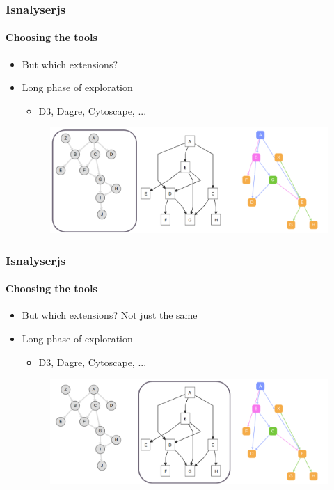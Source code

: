 \documentclass[9pt]{beamer}
\begin{document}
\begin{frame}
\frametitle{Isnalyserjs}
\framesubtitle{Choosing the tools}
\begin{itemize}%
	\item But which extensions?
	\item Long phase of exploration
	\begin{itemize}
		\item D3, Dagre, Cytoscape, ...
	\end{itemize}
	\begin{figure}
	\flushleft
	\includegraphics[width=1\linewidth]{figures/js_libs_1.pdf}
\end{figure}
\end{itemize}
\end{frame} 
\begin{frame}
\frametitle{Isnalyserjs}
\framesubtitle{Choosing the tools}
\begin{itemize}%
	\item But which extensions? Not just the same
	\item Long phase of exploration
	\begin{itemize}
		\item D3, Dagre, Cytoscape, ...
	\end{itemize}
	\begin{figure}
		\flushleft
		\includegraphics[width=1\linewidth]{figures/js_libs_2.pdf}
	\end{figure}
\end{itemize}
\end{frame} 
\end{document}
